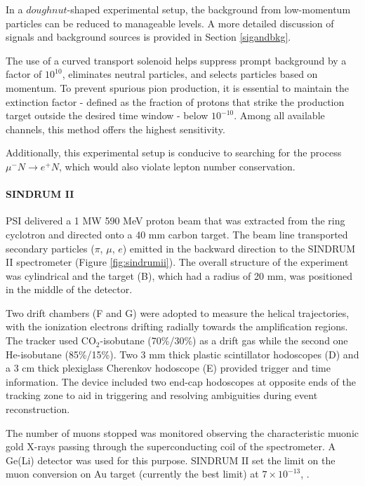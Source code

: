In a $doughnut$-shaped experimental setup, the background 
from low-momentum particles can be reduced to manageable levels.
A more detailed discussion of signals and background sources is provided in Section \ref{sigandbkg}.

The use of a curved transport solenoid helps suppress 
prompt background by a factor of $10^{10}$, eliminates 
neutral particles, and selects particles based on momentum. 
To prevent spurious pion production, it is essential to maintain the 
extinction factor - defined as the fraction of protons that strike the 
production target outside the desired time window - below $10^{-10}$. 
Among all available channels, this method offers the highest sensitivity.

Additionally, this experimental setup is conducive to 
searching for the process $\mu^- N \rightarrow e^+ N$, which would also violate lepton number conservation.
\paragraph{SINDRUM II}
PSI delivered a 1 MW 590 MeV proton 
beam that was extracted from the ring
cyclotron and directed onto a 40 
mm carbon target. The beam line
transported secondary particles ($\pi$, $\mu$, $e$) 
emitted in the backward 
direction to the SINDRUM II spectrometer 
(Figure \ref{fig:sindrumii}).
The overall structure of the experiment
was cylindrical and the target (B), 
which had a radius of 20 mm, was positioned
in the middle of the detector.

Two drift chambers (F and G) were adopted to measure
the helical trajectories, with the 
ionization electrons drifting radially 
towards the amplification 
regions. The tracker used CO$_2$-isobutane 
(70\%/30\%) as a drift
gas while the second one He-isobutane 
(85\%/15\%). Two 3 mm thick plastic 
scintillator hodoscopes (D) and a 3 cm 
thick plexiglass Cherenkov hodoscope 
(E) provided trigger and time information. 
The device included two end-cap hodoscopes 
at opposite ends of the tracking zone to 
aid in triggering 
and resolving ambiguities during event reconstruction.

The number of muons stopped
was monitored observing the characteristic 
muonic gold X-rays passing through the
superconducting coil of the spectrometer. 
A Ge(Li) detector was used for this purpose.
SINDRUM II set the limit on the 
muon conversion on Au target 
(currently the best limit) at $7 \times 10^{-13}$, 
\cite{SINDRUMII:2006dvw}.

